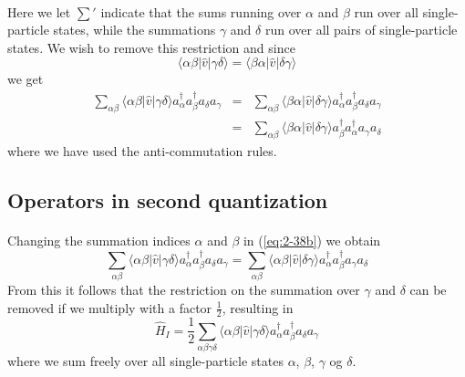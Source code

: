 \documentclass[%
twoside,                 %
final,                   %
10pt]{article}
\begin{document}
\paragraph{}
Here we let $\sum'$ indicate that the sums running over $\alpha$ and $\beta$ run over all
single-particle states, while the summations  $\gamma$ and $\delta$ 
run over all pairs of single-particle states. We wish to remove this restriction and since
\begin{equation}
	\langle \alpha\beta|\hat{v}|\gamma\delta\rangle = \langle \beta\alpha|\hat{v}|\delta\gamma\rangle \label{eq:2-37}
\end{equation}
we get
\begin{eqnarray}
	\sum_{\alpha\beta} \langle \alpha\beta|\hat{v}|\gamma\delta\rangle a^{\dagger}_\alpha a^{\dagger}_\beta a_\delta a_\gamma &=& 
		\sum_{\alpha\beta} \langle \beta\alpha|\hat{v}|\delta\gamma\rangle 
		a^{\dagger}_\alpha a^{\dagger}_\beta a_\delta a_\gamma \label{eq:2-38a} \\
	&=& \sum_{\alpha\beta}\langle \beta\alpha|\hat{v}|\delta\gamma\rangle
		a^{\dagger}_\beta a^{\dagger}_\alpha a_\gamma a_\delta \label{eq:2-38b}
\end{eqnarray}
where we  have used the anti-commutation rules.




\subsection*{Operators in second quantization}

\paragraph{}
Changing the summation indices 
$\alpha$ and $\beta$ in (\ref{eq:2-38b}) we obtain
\begin{equation}
	\sum_{\alpha\beta} \langle \alpha\beta|\hat{v}|\gamma\delta\rangle a^{\dagger}_\alpha a^{\dagger}_\beta a_\delta a_\gamma =
		 \sum_{\alpha\beta} \langle \alpha\beta|\hat{v}|\delta\gamma\rangle 
		  a^{\dagger}_\alpha a^{\dagger}_\beta  a_\gamma a_\delta \label{eq:2-38c}
\end{equation}
From this it follows that the restriction on the summation over $\gamma$ and $\delta$ can be removed if we multiply with a factor $\frac{1}{2}$, resulting in 
\begin{equation}
	\hat{H}_I = \frac{1}{2} \sum_{\alpha\beta\gamma\delta} \langle \alpha\beta|\hat{v}|\gamma\delta\rangle
		a^{\dagger}_\alpha a^{\dagger}_\beta a_\delta a_\gamma \label{eq:2-39}
\end{equation}
where we sum freely over all single-particle states $\alpha$, 
$\beta$, $\gamma$ og $\delta$.
\end{document}
